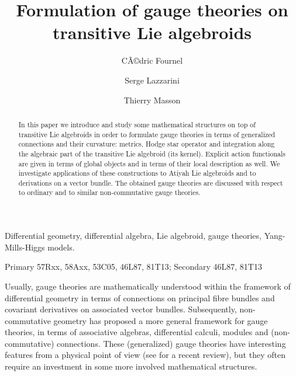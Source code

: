 \documentclass[number]{elsarticle}
\theoremstyle{definition}
\theoremstyle{remark}
\numberwithin{equation}{section}
\begin{document}
\begin{frontmatter}

\title{Formulation of gauge theories on transitive Lie algebroids}

\author{CÃ©dric Fournel}

\author{Serge Lazzarini}

\author{Thierry Masson}

\address{Centre de Physique ThÃ©orique\\
Case postale 907, CNRS-Luminy\\
F--13288 Marseille Cedex 9, France}

\begin{keyword}
Differential geometry, differential algebra, Lie algebroid, gauge theories, Yang-Mills-Higgs models.

\MSC[2010] Primary 57Rxx, 58Axx, 53C05, 46L87, 81T13; Secondary 46L87, 81T13
\end{keyword}

\begin{abstract}
In this paper we introduce and study some mathematical structures on top of transitive Lie algebroids in order to formulate gauge theories in terms of generalized connections and their curvature: metrics, Hodge star operator and integration along the algebraic part of the transitive Lie algebroid (its kernel). Explicit action functionals are given in terms of global objects and in terms of their local description as well. We investigate applications of these constructions to Atiyah Lie algebroids and to derivations on a vector bundle. The obtained gauge theories are discussed with respect to ordinary and to similar non-commutative gauge theories.
\end{abstract}

\end{frontmatter}

\newpage

\tableofcontents

\bigskip

Usually, gauge theories are mathematically understood within the framework of differential geometry in terms of connections on principal fibre bundles and covariant derivatives on associated vector bundles. Subsequently, non-commutative geometry has proposed a more general framework for gauge theories, in terms of associative algebras, differential calculi, modules and (non-commutative) connections. These (generalized) gauge theories have interesting features from a physical point of view (see \cite{Mass42} for a recent review), but they often require an investment in some more involved mathematical structures. 
\end{document}
